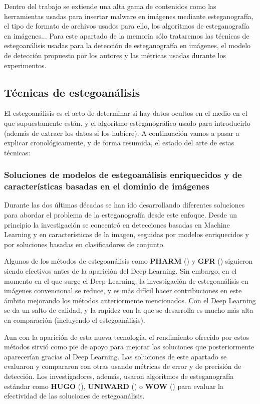 Dentro del trabajo se extiende una alta gama de contenidos como las herramientas usadas para insertar malware en imágenes mediante esteganografía, el tipo de formato de archivos usados para ello, los algoritmos de esteganografía en imágenes... Para este apartado de la memoria sólo trataremos las técnicas de estegoanálisis usadas para la detección de esteganografía en imágenes, el modelo de detección propuesto por los autores y las métricas usadas durante los experimentos.

\subsection{Técnicas de estegoanálisis}

El estegoanálisis es el acto de determinar si hay datos ocultos en el medio en el que supuestamente están, y el algoritmo esteganográfico usado para introducirlo (además de extraer los datos si los hubiere). A continuación vamos a pasar a explicar cronológicamente, y de forma resumida, el estado del arte de estas técnicas:

\subsubsection{Soluciones de modelos de estegoanálisis enriquecidos y de características basadas en el dominio de imágenes}

Durante las dos últimas décadas se han ido desarrollando diferentes soluciones para abordar el problema de la esteganografía desde este enfoque. Desde un principio la investigación se concentró en detecciones basadas en Machine Learning y en características de la imagen, seguidas por modelos enriquecidos y por soluciones basadas en clasificadores de conjunto. 

Algunos de los métodos de estegoanálisis como \textbf{PHARM} (\cite{pharm}) y \textbf{GFR} (\cite{gfr}) siguieron siendo efectivos antes de la aparición del Deep Learning. Sin embargo, en el momento en el que surge el Deep Learning, la investigación de estegoanálisis en imágenes convencional se reduce, y es más difícil hacer contribuciones en este ámbito mejorando los métodos anteriormente mencionados. Con el Deep Learning se da un salto de calidad, y la rapidez con la que se desarrolla es mucho más alta en comparación (incluyendo el estegoanálisis). %

Aun con la aparición de esta nueva tecnología, el rendimiento ofrecido por estos métodos sirvió como pie de apoyo para mejorar las soluciones que posteriormente aparecerían gracias al Deep Learning. Las soluciones de este apartado se evaluaron y compararon con otras usando métricas de error y de precisión de detección. Los investigadores, además, usaron algoritmos de esteganografía estándar como \textbf{HUGO} (\cite{hugo}), \textbf{UNIWARD} (\cite{uniward}) o \textbf{WOW} (\cite{wow}) para evaluar la efectividad de las soluciones de estegoanálisis.%

